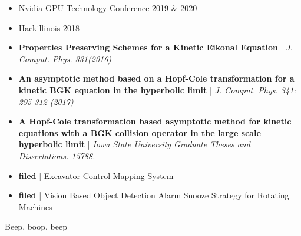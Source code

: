 \documentclass[10pt,a4paper]{altacv}
\begin{document}

\begin{itemize}
\item Nvidia GPU Technology Conference 2019 \& 2020
\item Hackillinois 2018

\end{itemize}


\begin{itemize}
\item \textbf{Properties Preserving Schemes for a Kinetic Eikonal Equation} | \textit{J. Comput. Phys. 331(2016)}
\item \textbf{An asymptotic method based on a Hopf-Cole transformation for a kinetic BGK equation in the hyperbolic limit} | \textit{J. Comput. Phys. 341: 295-312 (2017)}
\item \textbf{A Hopf-Cole transformation based asymptotic method for kinetic equations with a BGK collision operator in the large scale hyperbolic limit} | \textit{Iowa State University Graduate Theses and Dissertations. 15788.}

\end{itemize}


\begin{itemize}
\item \textbf{filed} | Excavator Control Mapping System
\item \textbf{filed} | Vision Based Object Detection Alarm Snooze Strategy for Rotating Machines

\end{itemize}




{}

{}
{}
{}

\vspace*{\fill}
\hspace*{\fill}
Beep, boop, beep

\clearpage
\end{document}
